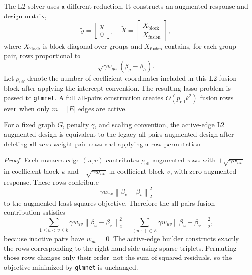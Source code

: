 \documentclass[twoside,11pt]{article}
\newcommand{\norm}[1]{\left\lVert #1 \right\rVert}
\begin{document}
The L2 solver uses a different reduction. It constructs an augmented response
and design matrix,
\[
  \tilde y =
  \begin{bmatrix} y \\ 0 \end{bmatrix}, \quad
  \tilde X =
  \begin{bmatrix} X_{\mathrm{block}} \\ X_{\mathrm{fusion}} \end{bmatrix},
\]
where $X_{\mathrm{block}}$ is block diagonal over groups and
$X_{\mathrm{fusion}}$ contains, for each group pair, rows proportional to
\[
  \sqrt{\gamma w_{gh}}(\beta_g-\beta_h).
\]
Let $p_{\mathrm{eff}}$ denote the number of coefficient coordinates included
in this L2 fusion block after applying the intercept convention.
The resulting lasso problem is passed to \texttt{glmnet}. A full all-pairs
construction creates $O(p_{\mathrm{eff}} k^2)$ fusion rows even when only
$m=|E|$ edges are active.

\begin{proposition}
\label{prop:l2-equivalence}
For a fixed graph $G$, penalty $\gamma$, and scaling convention, the
active-edge L2 augmented design is equivalent to the legacy all-pairs
augmented design after deleting all zero-weight pair rows and applying a row
permutation.
\end{proposition}

\begin{proof}
Each nonzero edge $(u,v)$ contributes $p_{\mathrm{eff}}$ augmented rows with
$+\sqrt{\gamma w_{uv}}$ in coefficient block $u$ and
$-\sqrt{\gamma w_{uv}}$ in coefficient block $v$, with zero augmented
response. These rows contribute
\[
  \gamma w_{uv}\norm{\beta_u-\beta_v}_2^2
\]
to the augmented least-squares objective. Therefore the all-pairs fusion
contribution satisfies
\[
  \sum_{1\leq u<v\leq k}
  \gamma w_{uv}\norm{\beta_u-\beta_v}_2^2
  =
  \sum_{(u,v)\in E}
  \gamma w_{uv}\norm{\beta_u-\beta_v}_2^2,
\]
because inactive pairs have $w_{uv}=0$. The active-edge builder constructs
exactly the rows corresponding to the right-hand side using sparse triplets.
Permuting those rows changes only their order, not the sum of squared
residuals, so the objective minimized by \texttt{glmnet} is unchanged.
\end{proof}
\end{document}
